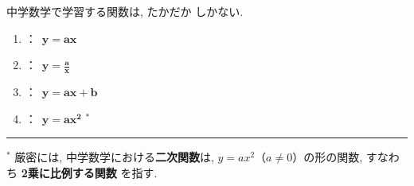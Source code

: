 中学数学で学習する関数は, たかだか  しかない.

\begin{enumerate}[itemsep=0.8em, topsep=0.2em, parsep=0pt, partopsep=0pt]
    \item {}：\ $\bm{y = ax}$
    \item {}：\ $\bm{y = \frac{a}{x}}$
    \item {}：\ $\bm{y = ax + b}$
    \item {}：\ $\bm{y = ax^2}$ $^{*}$
\end{enumerate}

\vfill
\noindent\rule{\textwidth}{0.4pt}

\vspace{0.2em}
\noindent
$^{*}$ 厳密には, 中学数学における\textbf{二次関数}は, $y = ax^2$（$a \neq 0$）の形の関数, すなわち \textbf{2乗に比例する関数} を指す.

\newpage
